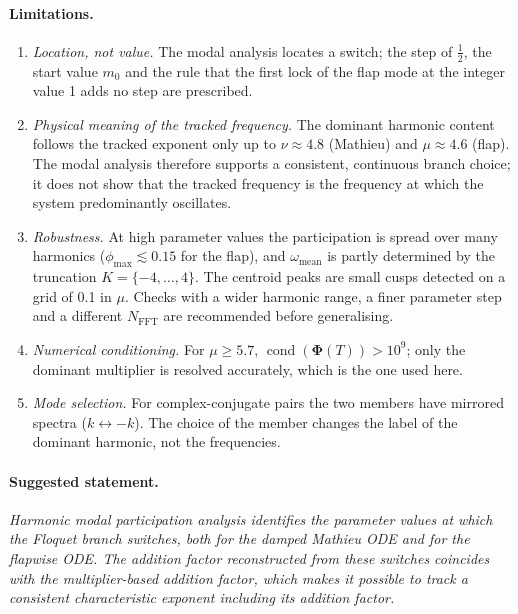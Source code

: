 \documentclass[11pt,a4paper]{article}
\begin{document}
\paragraph{Limitations.}
\begin{enumerate}
  \item \emph{Location, not value.} The modal analysis locates a switch; the step of
        $\tfrac{1}{2}$, the start value $m_0$ and the rule that the first lock of the
        flap mode at the integer value 1 adds no step are prescribed.
  \item \emph{Physical meaning of the tracked frequency.} The dominant harmonic content
        follows the tracked exponent only up to $\nu \approx 4.8$ (Mathieu) and
        $\mu \approx 4.6$ (flap). The modal analysis therefore supports a consistent,
        continuous branch choice; it does not show that the tracked frequency is the
        frequency at which the system predominantly oscillates.
  \item \emph{Robustness.} At high parameter values the participation is spread over
        many harmonics ($\phi_\text{max} \lesssim 0.15$ for the flap), and
        $\omega_\text{mean}$ is partly determined by the truncation $K = \{-4,\dots,4\}$.
        The centroid peaks are small cusps detected on a grid of 0.1 in $\mu$. Checks with
        a wider harmonic range, a finer parameter step and a different $N_\text{FFT}$ are
        recommended before generalising.
  \item \emph{Numerical conditioning.} For $\mu \ge 5.7$, $\operatorname{cond}(\bm{\Phi}(T))
        > 10^9$; only the dominant multiplier is resolved accurately, which is the one
        used here.
  \item \emph{Mode selection.} For complex-conjugate pairs the two members have mirrored
        spectra ($k \leftrightarrow -k$). The choice of the member changes the label of the
        dominant harmonic, not the frequencies.
\end{enumerate}

\paragraph{Suggested statement.} \emph{Harmonic modal participation analysis identifies
the parameter values at which the Floquet branch switches, both for the damped Mathieu
ODE and for the flapwise ODE. The addition factor reconstructed from these switches
coincides with the multiplier-based addition factor, which makes it possible to track a
consistent characteristic exponent including its addition factor.}
\end{document}
